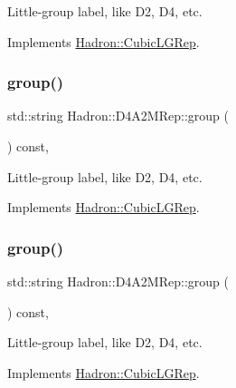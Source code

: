 Little-\/group label, like D2, D4, etc. 

Implements \mbox{\hyperlink{structHadron_1_1CubicLGRep_a9bdb14b519a611d21379ed96a3a9eb41}{Hadron\+::\+Cubic\+L\+G\+Rep}}.

\mbox{\label{structHadron_1_1D4A2MRep_aa38e3e3ecd9017b530bc7b9a89197255}} 
\subsubsection{\texorpdfstring{group()}{group()}\hspace{0.1cm}{\footnotesize\ttfamily [2/3]}}
{\footnotesize\ttfamily std\+::string Hadron\+::\+D4\+A2\+M\+Rep\+::group (\begin{DoxyParamCaption}{ }\end{DoxyParamCaption}) const\hspace{0.3cm}{\ttfamily [inline]}, {\ttfamily [virtual]}}

Little-\/group label, like D2, D4, etc. 

Implements \mbox{\hyperlink{structHadron_1_1CubicLGRep_a9bdb14b519a611d21379ed96a3a9eb41}{Hadron\+::\+Cubic\+L\+G\+Rep}}.

\mbox{\label{structHadron_1_1D4A2MRep_aa38e3e3ecd9017b530bc7b9a89197255}} 
\subsubsection{\texorpdfstring{group()}{group()}\hspace{0.1cm}{\footnotesize\ttfamily [3/3]}}
{\footnotesize\ttfamily std\+::string Hadron\+::\+D4\+A2\+M\+Rep\+::group (\begin{DoxyParamCaption}{ }\end{DoxyParamCaption}) const\hspace{0.3cm}{\ttfamily [inline]}, {\ttfamily [virtual]}}

Little-\/group label, like D2, D4, etc. 

Implements \mbox{\hyperlink{structHadron_1_1CubicLGRep_a9bdb14b519a611d21379ed96a3a9eb41}{Hadron\+::\+Cubic\+L\+G\+Rep}}.

\mbox{\label{structHadron_1_1D4A2MRep_ab6b82d71a2ad447c611e9b26784bc880}} 
